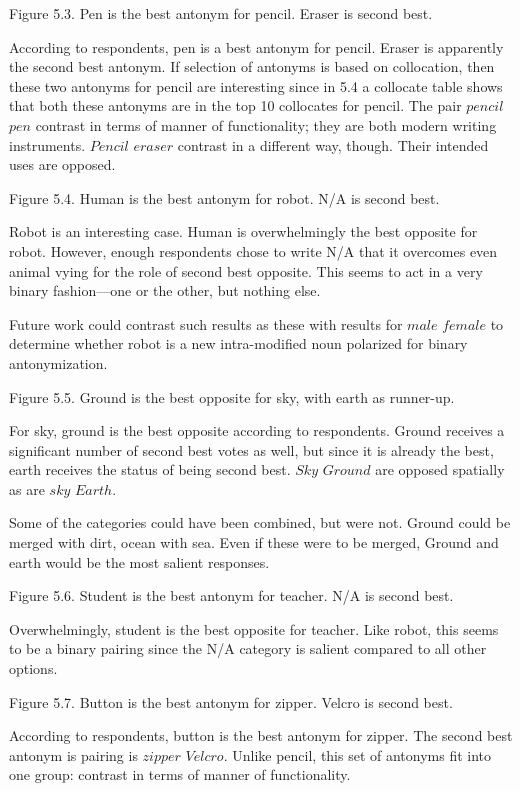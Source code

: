 	Figure 5.3. Pen is the best antonym for pencil. Eraser is second best.

According to respondents, pen is a best antonym for pencil.  Eraser is apparently the second best antonym.  If selection of antonyms is based on collocation, then these two antonyms for pencil are interesting since in 5.4 a collocate table shows that both these antonyms are in the top 10 collocates for pencil.  The pair $pencil$ \opp $pen$ contrast in terms of manner of functionality; they are both modern writing instruments.  $Pencil$ \opp $eraser$ contrast in a different way, though.  Their intended uses are opposed.


	Figure 5.4. Human is the best antonym for robot.  N/A is second best.

Robot is an interesting case.  Human is overwhelmingly the best opposite for robot.  However, enough respondents chose to write N/A that it overcomes even animal vying for the role of second best opposite.  This seems to act in a very binary fashion—one or the other, but nothing else.  

Future work could contrast such results as these with results for $male$ \opp $female$ to determine whether robot is a new intra-modified noun polarized for binary antonymization.


	Figure 5.5. Ground is the best opposite for sky, with earth as runner-up.

For sky, ground is the best opposite according to respondents.  Ground receives a significant number of second best votes as well, but since it is already the best, earth receives the status of being second best.  $Sky$ \opp $Ground$ are opposed spatially as are $sky$ \opp $Earth$.  

Some of the categories could have been combined, but were not. Ground could be merged with dirt, ocean with sea.  Even if these were to be merged, Ground and earth would be the most salient responses.


	Figure 5.6. Student is the best antonym for teacher.  N/A is second best.

Overwhelmingly, student is the best opposite for teacher.  Like robot, this seems to be a binary pairing since the N/A category is salient compared to all other options.



	Figure 5.7. Button is the best antonym for zipper. Velcro is second best.

According to respondents, button is the best antonym for zipper.  The second best antonym is pairing is $zipper$ \opp $Velcro$.  Unlike pencil, this set of antonyms fit into one group: contrast in terms of manner of functionality.  

